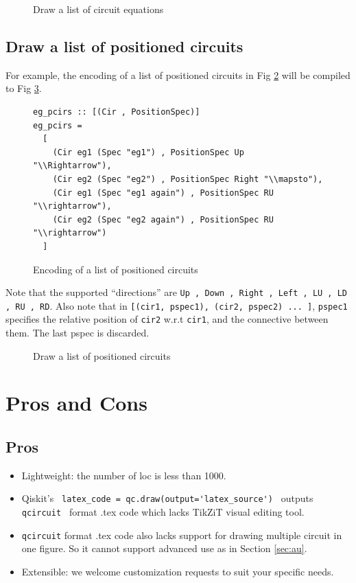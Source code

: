 \documentclass{article}
\begin{document}
  
\begin{figure}[h]
  \centering {}
  \caption{Draw a list of circuit equations}
  \label{fig:des}
\end{figure}

\subsection{Draw a list of positioned circuits }

For example, the encoding of a list of positioned circuits in Fig
\ref{fig:epc} will be compiled to Fig \ref{fig:pc}.

\begin{figure}[H]
\begin{verbatim}
eg_pcirs :: [(Cir , PositionSpec)]
eg_pcirs =
  [
    (Cir eg1 (Spec "eg1") , PositionSpec Up "\\Rightarrow"),
    (Cir eg2 (Spec "eg2") , PositionSpec Right "\\mapsto"),
    (Cir eg1 (Spec "eg1 again") , PositionSpec RU "\\rightarrow"),
    (Cir eg2 (Spec "eg2 again") , PositionSpec RU "\\rightarrow")
  ]
\end{verbatim}
  \caption{Encoding of a list of positioned circuits}
  \label{fig:epc}
\end{figure}


Note that the supported ``directions'' are
\verb|Up , Down , Right , Left , LU , LD , RU , RD|.  Also note that
in \verb|[(cir1, pspec1), (cir2, pspec2) ... ]|, \verb|pspec1|
specifies the relative position of \verb|cir2| w.r.t \verb|cir1|, and
the connective between them. The last pspec is discarded.

  
\begin{figure}[h]
  \centering {}
  \caption{Draw a list of positioned circuits}
  \label{fig:pc}
\end{figure}

\section{Pros and Cons}
\subsection{Pros}
\begin{itemize}
\item[1.] Lightweight: the number of loc is less than 1000.
\item[2.] Qiskit's
  \verb| latex_code = qc.draw(output='latex_source') | outputs
  \verb| qcircuit | format .tex code which lacks TikZiT visual editing
  tool.
\item[3.] \verb|qcircuit| format .tex code also lacks support for
  drawing multiple circuit in one figure. So it cannot support
  advanced use as in Section \ref{sec:au}.
\item[4.] Extensible: we welcome customization requests to suit your
  specific needs.
\end{itemize}
\end{document}
